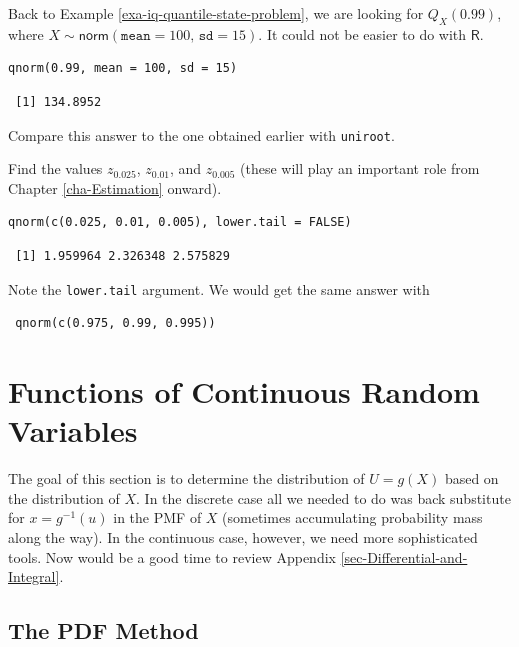 \documentclass[captions=tableheading]{scrbook}
\begin{document}
\begin{example}
Back to Example \ref{exa-iq-quantile-state-problem}, we are looking for \(Q_{X}(0.99)\), where \(X\sim\mathsf{norm}(\mathtt{mean}=100,\,\mathtt{sd}=15)\). It could not be easier to do with \(\mathsf{R}\). 


\lstset{language=R}
\begin{lstlisting}
qnorm(0.99, mean = 100, sd = 15)
\end{lstlisting}

\begin{verbatim}
 [1] 134.8952
\end{verbatim}

Compare this answer to the one obtained earlier with \texttt{uniroot}.
\end{example}

\begin{example}
Find the values \(z_{0.025}\), \(z_{0.01}\), and \(z_{0.005}\) (these will play an important role from Chapter \ref{cha-Estimation} onward).
\end{example}


\lstset{language=R}
\begin{lstlisting}
qnorm(c(0.025, 0.01, 0.005), lower.tail = FALSE)
\end{lstlisting}

\begin{verbatim}
 [1] 1.959964 2.326348 2.575829
\end{verbatim}

Note the \texttt{lower.tail} argument. We would get the same answer with
\begin{verbatim}
 qnorm(c(0.975, 0.99, 0.995))
\end{verbatim}
\section{Functions of Continuous Random Variables}
\label{sec-1-4}
\label{sec-Functions-of-Continuous}


The goal of this section is to determine the distribution of \(U=g(X)\) based on the distribution of \(X\). In the discrete case all we needed to do was back substitute for \(x=g^{-1}(u)\) in the PMF of \(X\) (sometimes accumulating probability mass along the way). In the continuous case, however, we need more sophisticated tools. Now would be a good time to review Appendix \ref{sec-Differential-and-Integral}.
\subsection{The PDF Method}
\label{sec-1-4-1}
\end{document}

